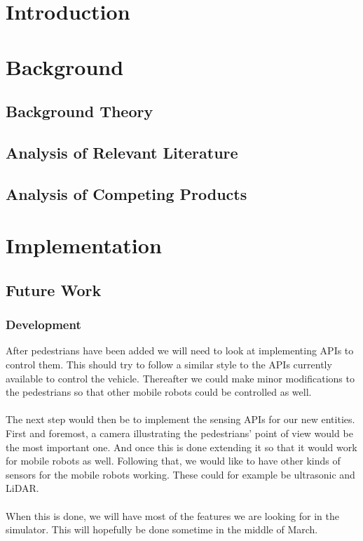 \documentclass[12pt,oneside]{report}
\begin{document}


\tableofcontents
\newpage

\chapter{Introduction}



\chapter{Background}

\section{Background Theory}


\section{Analysis of Relevant Literature} \label{BackgroundLit}


\section{Analysis of Competing Products} \label{AoCP}




\chapter{Implementation}

\section{Future Work} \label{FuturePlanning}
\subsection{Development}
After pedestrians have been added we will need to look at implementing APIs to control them. This should try to follow a similar style to the APIs currently available to control the vehicle. Thereafter we could make minor modifications to the pedestrians so that other mobile robots could be controlled as well. 
\\~\\
The next step would then be to implement the sensing APIs for our new entities. First and foremost, a camera illustrating the pedestrians' point of view would be the most important one. And once this is done extending it so that it would work for mobile robots as well. 
Following that, we would like to have other kinds of sensors for the mobile robots working. These could for example be ultrasonic and LiDAR. 
\\~\\
When this is done, we will have most of the features we are looking for in the simulator. This will hopefully be done sometime in the middle of March.
\end{document}
